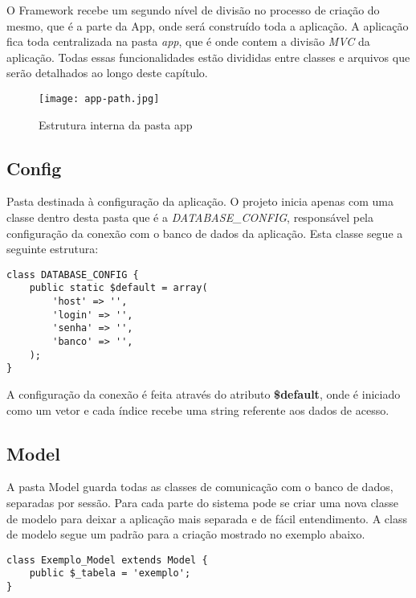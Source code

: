         O Framework recebe um segundo nível de divisão no processo de criação do mesmo, que é a parte da App, onde será construído toda a aplicação. A aplicação fica toda centralizada na pasta \emph{app}, que é onde contem a divisão \emph{MVC} da aplicação. Todas essas funcionalidades estão divididas entre classes e arquivos que serão detalhados ao longo deste capítulo.

    \begin{figure}[!htb]
        \centering
        \texttt{[image: app-path.jpg]}
        \caption{\small Estrutura interna da pasta app}
        \label{cap:sass}
    \end{figure}

        \subsection{Config\label{sec:app-config}}
            Pasta destinada à configuração da aplicação. O projeto inicia apenas com uma classe dentro desta pasta que é a \emph{DATABASE\_CONFIG}, responsável pela configuração da conexão com o banco de dados da aplicação. Esta classe segue a seguinte estrutura:


\begin{lstlisting}
class DATABASE_CONFIG {
    public static $default = array(
        'host' => '',
        'login' => '',
        'senha' => '',
        'banco' => '',
    );
}
\end{lstlisting}


            A configuração da conexão é feita através do atributo \textbf{\$default}, onde é iniciado como um vetor e cada índice recebe uma string referente aos dados de acesso.



        \subsection{Model\label{sec:app-model}}
            A pasta Model guarda todas as classes de comunicação com o banco de dados, separadas por sessão. Para cada parte do sistema pode se criar uma nova classe de modelo para deixar a aplicação mais separada e de fácil entendimento. A class de modelo segue um padrão para a criação mostrado no exemplo abaixo.

\begin{lstlisting}
class Exemplo_Model extends Model {
    public $_tabela = 'exemplo';
}
\end{lstlisting}

